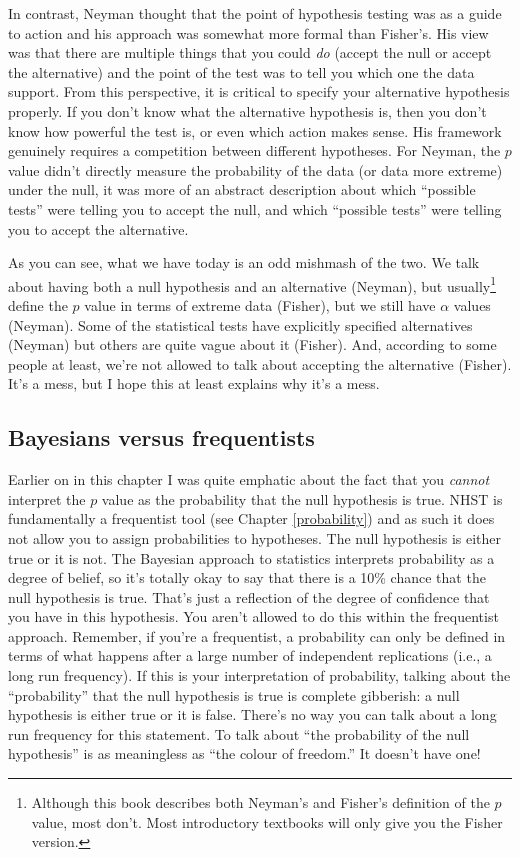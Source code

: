 \documentclass[
]{book}
\begin{document}
In contrast, Neyman thought that the point of hypothesis testing was as a guide to action and his approach was somewhat more formal than Fisher's. His view was that there are multiple things that you could \emph{do} (accept the null or accept the alternative) and the point of the test was to tell you which one the data support. From this perspective, it is critical to specify your alternative hypothesis properly. If you don't know what the alternative hypothesis is, then you don't know how powerful the test is, or even which action makes sense. His framework genuinely requires a competition between different hypotheses. For Neyman, the \(p\) value didn't directly measure the probability of the data (or data more extreme) under the null, it was more of an abstract description about which ``possible tests'' were telling you to accept the null, and which ``possible tests'' were telling you to accept the alternative.

As you can see, what we have today is an odd mishmash of the two. We talk about having both a null hypothesis and an alternative (Neyman), but usually\footnote{Although this book describes both Neyman's and Fisher's definition of the \(p\) value, most don't. Most introductory textbooks will only give you the Fisher version.} define the \(p\) value in terms of extreme data (Fisher), but we still have \(\alpha\) values (Neyman). Some of the statistical tests have explicitly specified alternatives (Neyman) but others are quite vague about it (Fisher). And, according to some people at least, we're not allowed to talk about accepting the alternative (Fisher). It's a mess, but I hope this at least explains why it's a mess.

\hypertarget{bayesians-versus-frequentists}{%
\subsection{Bayesians versus frequentists}\label{bayesians-versus-frequentists}}

Earlier on in this chapter I was quite emphatic about the fact that you \emph{cannot} interpret the \(p\) value as the probability that the null hypothesis is true. NHST is fundamentally a frequentist tool (see Chapter \ref{probability}) and as such it does not allow you to assign probabilities to hypotheses. The null hypothesis is either true or it is not. The Bayesian approach to statistics interprets probability as a degree of belief, so it's totally okay to say that there is a 10\% chance that the null hypothesis is true. That's just a reflection of the degree of confidence that you have in this hypothesis. You aren't allowed to do this within the frequentist approach. Remember, if you're a frequentist, a probability can only be defined in terms of what happens after a large number of independent replications (i.e., a long run frequency). If this is your interpretation of probability, talking about the ``probability'' that the null hypothesis is true is complete gibberish: a null hypothesis is either true or it is false. There's no way you can talk about a long run frequency for this statement. To talk about ``the probability of the null hypothesis'' is as meaningless as ``the colour of freedom.'' It doesn't have one!
\end{document}
